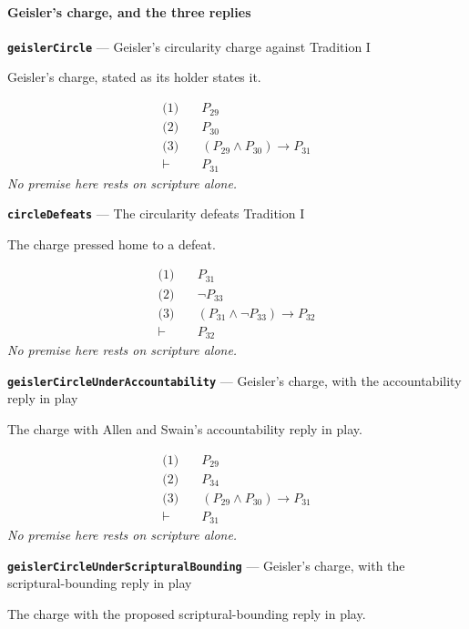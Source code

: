 \documentclass[11pt]{article}
\begin{document}
\paragraph*{Geisler's charge, and the three replies}
\leavevmode\par
\par\medskip\noindent\textbf{\texttt{geisler\allowbreak{}Circle}} --- Geisler's circularity charge against Tradition I\par\nobreak\noindent
Geisler's charge, stated as its holder states it.

\begin{align*}
  \text{(1)} \quad & P_{29} \\
  \text{(2)} \quad & P_{30} \\
  \text{(3)} \quad & (P_{29} \land P_{30}) \rightarrow P_{31} \\
  \vdash \quad & P_{31}
\end{align*}
\emph{No premise here rests on scripture alone.}
\par\medskip\noindent\textbf{\texttt{circle\allowbreak{}Defeats}} --- The circularity defeats Tradition I\par\nobreak\noindent
The charge pressed home to a defeat.

\begin{align*}
  \text{(1)} \quad & P_{31} \\
  \text{(2)} \quad & \lnot P_{33} \\
  \text{(3)} \quad & (P_{31} \land \lnot P_{33}) \rightarrow P_{32} \\
  \vdash \quad & P_{32}
\end{align*}
\emph{No premise here rests on scripture alone.}
\par\medskip\noindent\textbf{\texttt{geisler\allowbreak{}Circle\allowbreak{}Under\allowbreak{}Accountability}} --- Geisler's charge, with the accountability reply in play\par\nobreak\noindent
The charge with Allen and Swain's accountability reply in play.

\begin{align*}
  \text{(1)} \quad & P_{29} \\
  \text{(2)} \quad & P_{34} \\
  \text{(3)} \quad & (P_{29} \land P_{30}) \rightarrow P_{31} \\
  \vdash \quad & P_{31}
\end{align*}
\emph{No premise here rests on scripture alone.}
\par\medskip\noindent\textbf{\texttt{geisler\allowbreak{}Circle\allowbreak{}Under\allowbreak{}Scriptural\allowbreak{}Bounding}} --- Geisler's charge, with the scriptural-bounding reply in play\par\nobreak\noindent
The charge with the proposed scriptural-bounding reply in play.
\end{document}
